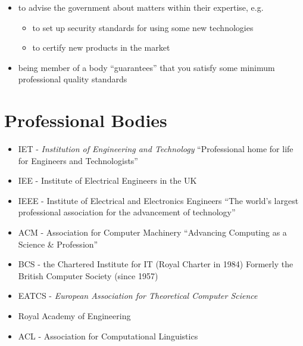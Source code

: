 \documentclass{article}
\begin{document}
\begin{itemize}
\begin{itemize}
\item to advise the government about matters within their expertise, e.g.
\begin{itemize}
\item to set up security standards for using some new technologies
\item to certify new products in the market
\end{itemize}
\item being member of a body ``guarantees'' that you satisfy some minimum professional quality standards
\end{itemize}
\end{itemize}


\section{Professional Bodies}
\begin{itemize}
\item IET - \emph{Institution of Engineering and Technology} ``Professional home for life for Engineers and Technologists''
\item IEE - Institute of Electrical Engineers in the UK
\item IEEE -  Institute of Electrical and Electronics Engineers ``The world's largest professional association for the advancement of technology''
\item ACM - Association for Computer Machinery ``Advancing Computing as a Science \& Profession''
\item BCS - the Chartered Institute for IT (Royal Charter in 1984) Formerly the British Computer Society (since 1957)
\item EATCS - \emph{European Association for Theoretical Computer Science}
\item Royal Academy of Engineering
\item ACL - Association for Computational Linguistics
\end{itemize}
\end{document}
